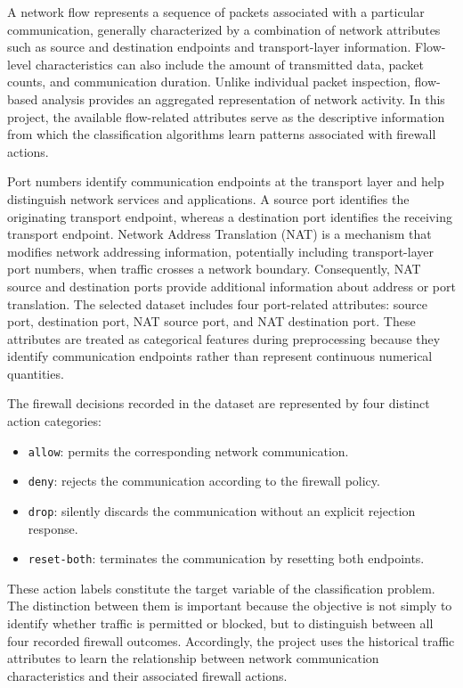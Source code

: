 A network flow represents a sequence of packets associated with a particular communication, generally characterized by a combination of network attributes such as source and destination endpoints and transport-layer information. Flow-level characteristics can also include the amount of transmitted data, packet counts, and communication duration. Unlike individual packet inspection, flow-based analysis provides an aggregated representation of network activity. In this project, the available flow-related attributes serve as the descriptive information from which the classification algorithms learn patterns associated with firewall actions.

Port numbers identify communication endpoints at the transport layer and help distinguish network services and applications. A source port identifies the originating transport endpoint, whereas a destination port identifies the receiving transport endpoint. Network Address Translation (NAT) is a mechanism that modifies network addressing information, potentially including transport-layer port numbers, when traffic crosses a network boundary. Consequently, NAT source and destination ports provide additional information about address or port translation. The selected dataset includes four port-related attributes: source port, destination port, NAT source port, and NAT destination port. These attributes are treated as categorical features during preprocessing because they identify communication endpoints rather than represent continuous numerical quantities.

The firewall decisions recorded in the dataset are represented by four distinct action categories:

\begin{itemize}
    \item \texttt{allow}: permits the corresponding network communication.
    \item \texttt{deny}: rejects the communication according to the firewall policy.
    \item \texttt{drop}: silently discards the communication without an explicit rejection response.
    \item \texttt{reset-both}: terminates the communication by resetting both endpoints.
\end{itemize}

These action labels constitute the target variable of the classification problem. The distinction between them is important because the objective is not simply to identify whether traffic is permitted or blocked, but to distinguish between all four recorded firewall outcomes. Accordingly, the project uses the historical traffic attributes to learn the relationship between network communication characteristics and their associated firewall actions.

